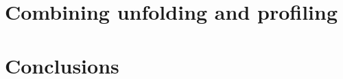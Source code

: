 \documentclass[12pt]{article}
\begin{document}
\section{Combining unfolding and profiling}

\section{Conclusions}





\end{document}
